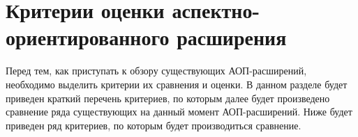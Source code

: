 
\section{Критерии оценки аспектно-ориентированного расширения}
\label{sec:aop_extension_criteria}
Перед тем, как приступать к обзору существующих АОП-расширений, необходимо
выделить критерии их сравнения и оценки.
В данном разделе будет приведен краткий перечень критериев, по которым далее
будет произведено сравнение ряда существующих на данный момент АОП-расширений.
Ниже будет приведен ряд критериев, по которым будет производиться сравнение.

